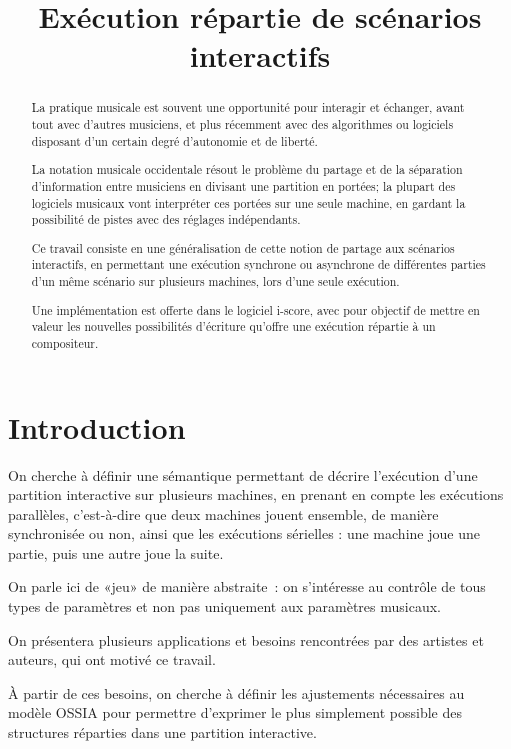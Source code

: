 \documentclass{article}
\title{Exécution répartie de scénarios interactifs}
\newcommand\ossia{OSSIA\xspace}
\begin{document}
\maketitle
\begin{abstract}
    La pratique musicale est souvent une opportunité pour interagir et échanger, 
    avant tout avec d'autres musiciens, et plus récemment avec des algorithmes ou logiciels 
    disposant d'un certain degré d'autonomie et de liberté.
    
    La notation musicale occidentale résout le problème du partage et de la séparation d'information entre musiciens 
    en divisant une partition en portées; la plupart des logiciels musicaux vont interpréter ces portées sur une seule machine, en gardant la possibilité de pistes avec des réglages indépendants. 
    
    Ce travail consiste en une généralisation de cette notion de partage aux scénarios interactifs, en permettant une exécution synchrone ou asynchrone de différentes parties d'un même scénario sur plusieurs machines, lors d'une seule exécution.
    
    Une implémentation est offerte dans le logiciel i-score, avec pour objectif de mettre en valeur 
    les nouvelles possibilités d'écriture qu'offre une exécution répartie à un compositeur.
\end{abstract}

\section{Introduction}
On cherche à définir une sémantique permettant de décrire l'exécution d'une partition interactive sur plusieurs machines, en prenant en compte les exécutions parallèles, c'est-à-dire que deux machines jouent ensemble, de manière synchronisée ou non, ainsi que les exécutions sérielles : une machine joue une partie, puis une autre joue la suite.

On parle ici de «jeu» de manière abstraite~: on s'intéresse au contrôle de tous types de paramètres et non pas uniquement aux paramètres musicaux.

On présentera plusieurs applications et besoins rencontrées par des artistes et auteurs, qui ont motivé ce travail.

À partir de ces besoins, on cherche à définir les ajustements nécessaires au modèle \ossia pour permettre d'exprimer le plus simplement possible des structures réparties dans une partition interactive.
\end{document}
